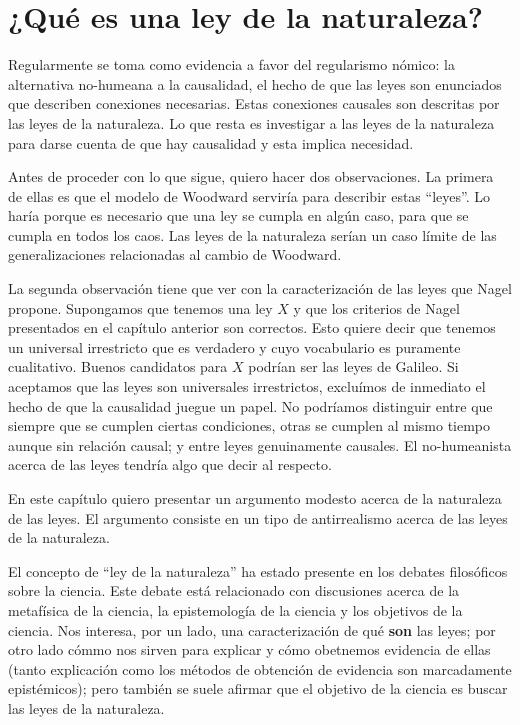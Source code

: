 \chapter{¿Qué es una ley de la naturaleza?}

\noindent Regularmente se toma como evidencia a favor del regularismo nómico: la alternativa no-humeana a la causalidad, el hecho de que las leyes son enunciados que describen conexiones necesarias. Estas conexiones causales son descritas por las leyes de la naturaleza. Lo que resta es investigar a las leyes de la naturaleza para darse cuenta de que hay causalidad y esta implica necesidad.

Antes de proceder con lo que sigue, quiero hacer dos observaciones. La primera de ellas es que el modelo de Woodward serviría para describir estas ``leyes''. Lo haría porque es necesario que una ley se cumpla en algún caso, para que se cumpla en todos los caos. Las leyes de la naturaleza serían un caso límite de las generalizaciones relacionadas al cambio de Woodward.

La segunda observación tiene que ver con la caracterización de las leyes que Nagel propone. Supongamos que tenemos una ley $X$ y que los criterios de Nagel presentados en el capítulo anterior son correctos. Esto quiere decir que tenemos un universal irrestricto que es verdadero y cuyo vocabulario es puramente cualitativo. Buenos candidatos para $X$ podrían ser las leyes de Galileo. Si aceptamos que las leyes son universales irrestrictos, excluímos de inmediato el hecho de que la causalidad juegue un papel. No podríamos distinguir entre que siempre que se cumplen ciertas condiciones, otras se cumplen al mismo tiempo aunque sin relación causal; y entre leyes genuinamente causales. El no-humeanista acerca de las leyes tendría algo que decir al respecto.

En este capítulo quiero presentar un argumento modesto acerca de la naturaleza de las leyes. El argumento consiste en un tipo de antirrealismo acerca de las leyes de la naturaleza.

El concepto de ``ley de la naturaleza'' ha estado presente en los debates filosóficos sobre la ciencia. Este debate está relacionado con discusiones acerca de la metafísica de la ciencia, la epistemología de la ciencia y los objetivos de la ciencia. Nos interesa, por un lado, una caracterización de qué \textbf{son} las leyes; por otro lado cómmo nos sirven para explicar y cómo obetnemos evidencia de ellas (tanto explicación como los métodos de obtención de evidencia son marcadamente epistémicos); pero también se suele afirmar que el objetivo de la ciencia es buscar las leyes de la naturaleza.

